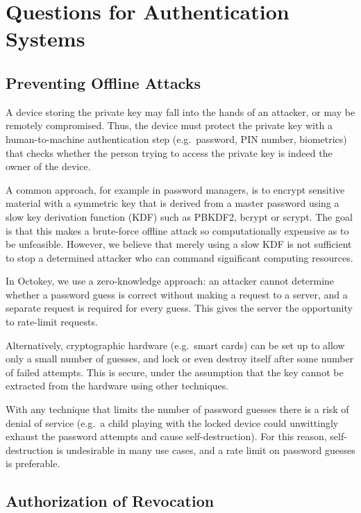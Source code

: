 \section{Questions for Authentication Systems}

\subsection{Preventing Offline Attacks}\label{sec:offline}

A device storing the private key may fall into the hands of an attacker, or may be remotely
compromised. Thus, the device must protect the private key with a human-to-machine authentication
step (e.g.\ password, PIN number, biometrics) that checks whether the person trying to access the
private key is indeed the owner of the device.

A common approach, for example in password managers, is to encrypt sensitive material with a
symmetric key that is derived from a master password using a slow key derivation function (KDF) such
as PBKDF2, bcrypt or scrypt. The goal is that this makes a brute-force offline attack so
computationally expensive as to be unfeasible. However, we believe that merely using a slow KDF is
not sufficient to stop a determined attacker who can command significant computing resources.

In Octokey, we use a zero-knowledge approach: an attacker cannot determine whether a password guess
is correct without making a request to a server, and a separate request is required for every guess.
This gives the server the opportunity to rate-limit requests.

Alternatively, cryptographic hardware (e.g.\ smart cards) can be set up to allow only a small number
of guesses, and lock or even destroy itself after some number of failed attempts. This is secure,
under the assumption that the key cannot be extracted from the hardware using other techniques.

With any technique that limits the number of password guesses there is a risk of denial of service
(e.g.\ a child playing with the locked device could unwittingly exhaust the password attempts and
cause self-destruction). For this reason, self-destruction is undesirable in many use cases, and a
rate limit on password guesses is preferable.

\subsection{Authorization of Revocation}\label{sec:auth-revocation}

